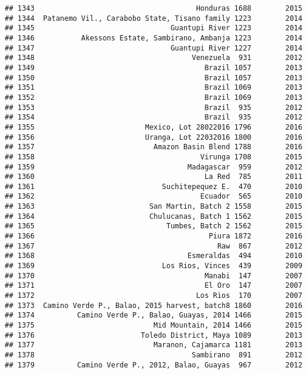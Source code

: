 \documentclass[
]{article}
\begin{document}
\begin{verbatim}
## 1343                                      Honduras 1688        2015
## 1344  Patanemo Vil., Carabobo State, Tisano family 1223        2014
## 1345                                Guantupi River 1223        2014
## 1346           Akessons Estate, Sambirano, Ambanja 1223        2014
## 1347                                Guantupi River 1227        2014
## 1348                                     Venezuela  931        2012
## 1349                                        Brazil 1057        2013
## 1350                                        Brazil 1057        2013
## 1351                                        Brazil 1069        2013
## 1352                                        Brazil 1069        2013
## 1353                                        Brazil  935        2012
## 1354                                        Brazil  935        2012
## 1355                          Mexico, Lot 28022016 1796        2016
## 1356                          Uranga, Lot 22032016 1800        2016
## 1357                            Amazon Basin Blend 1788        2016
## 1358                                       Virunga 1708        2015
## 1359                                    Madagascar  959        2012
## 1360                                        La Red  785        2011
## 1361                              Suchitepequez E.  470        2010
## 1362                                       Ecuador  565        2010
## 1363                           San Martin, Batch 2 1558        2015
## 1364                           Chulucanas, Batch 1 1562        2015
## 1365                               Tumbes, Batch 2 1562        2015
## 1366                                         Piura 1872        2016
## 1367                                           Raw  867        2012
## 1368                                    Esmeraldas  494        2010
## 1369                              Los Rios, Vinces  439        2009
## 1370                                        Manabi  147        2007
## 1371                                        El Oro  147        2007
## 1372                                      Los Rios  170        2007
## 1373  Camino Verde P., Balao, 2015 harvest, batch8 1860        2016
## 1374          Camino Verde P., Balao, Guayas, 2014 1466        2015
## 1375                            Mid Mountain, 2014 1466        2015
## 1376                         Toledo District, Maya 1089        2013
## 1377                            Maranon, Cajamarca 1181        2013
## 1378                                     Sambirano  891        2012
## 1379          Camino Verde P., 2012, Balao, Guayas  967        2012

\end{verbatim}
\end{document}
